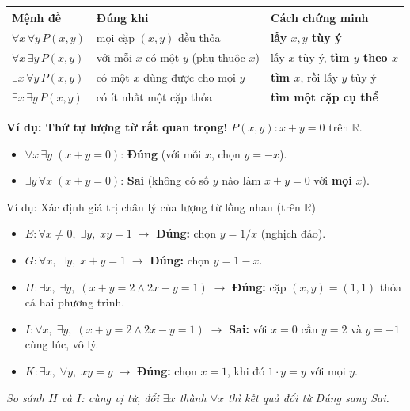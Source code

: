 \documentclass[12pt,a4paper]{article}
\begin{document}
\begin{center}
\renewcommand{\arraystretch}{1.25}
\begin{tabular}{lll}
\toprule
\textbf{Mệnh đề} & \textbf{Đúng khi} & \textbf{Cách chứng minh} \\
\midrule
$\forall x\,\forall y\, P(x, y)$ & mọi cặp $(x, y)$ đều thỏa & \textbf{lấy $x, y$ tùy ý} \\
$\forall x\,\exists y\, P(x, y)$ & với mỗi $x$ có một $y$ (phụ thuộc $x$) & lấy $x$ tùy ý, \textbf{tìm $y$ theo $x$} \\
$\exists x\,\forall y\, P(x, y)$ & có một $x$ dùng được cho mọi $y$ & \textbf{tìm $x$}, rồi lấy $y$ tùy ý \\
$\exists x\,\exists y\, P(x, y)$ & có ít nhất một cặp thỏa & \textbf{tìm một cặp cụ thể} \\
\bottomrule
\end{tabular}
\end{center}

\textbf{Ví dụ: Thứ tự lượng từ rất quan trọng!} $P(x, y) : x + y = 0$ trên $\mathbb{R}$.
\begin{itemize}
  \item $\forall x\,\exists y\;(x + y = 0)$: \textcolor{AccentGreen}{\textbf{Đúng}} (với mỗi $x$, chọn $y = -x$).
  \item $\exists y\,\forall x\;(x + y = 0)$: \textcolor{AccentRed}{\textbf{Sai}} (không có số $y$ nào làm $x + y = 0$ với \textbf{mọi} $x$).
\end{itemize}

\begin{baitap}{Ví dụ: Xác định giá trị chân lý của lượng từ lồng nhau (trên $\mathbb{R}$)}
\begin{itemize}
  \item $E: \forall x \neq 0,\; \exists y,\; xy = 1 \;\rightarrow$ \textcolor{AccentGreen}{\textbf{Đúng:}} chọn $y = 1/x$ (nghịch đảo).
  \item $G: \forall x,\; \exists y,\; x + y = 1 \;\rightarrow$ \textcolor{AccentGreen}{\textbf{Đúng:}} chọn $y = 1 - x$.
  \item $H: \exists x,\; \exists y,\; (x + y = 2 \land 2x - y = 1) \;\rightarrow$ \textcolor{AccentGreen}{\textbf{Đúng:}} cặp $(x, y) = (1, 1)$ thỏa cả hai phương trình.
  \item $I: \forall x,\; \exists y,\; (x + y = 2 \land 2x - y = 1) \;\rightarrow$ \textcolor{AccentRed}{\textbf{Sai:}} với $x = 0$ cần $y = 2$ và $y = -1$ cùng lúc, vô lý.
  \item $K: \exists x,\; \forall y,\; xy = y \;\rightarrow$ \textcolor{AccentGreen}{\textbf{Đúng:}} chọn $x = 1$, khi đó $1 \cdot y = y$ với mọi $y$.
\end{itemize}
\textit{So sánh $H$ và $I$: cùng vị từ, đổi $\exists x$ thành $\forall x$ thì kết quả đổi từ Đúng sang Sai.}
\end{baitap}
\end{document}
